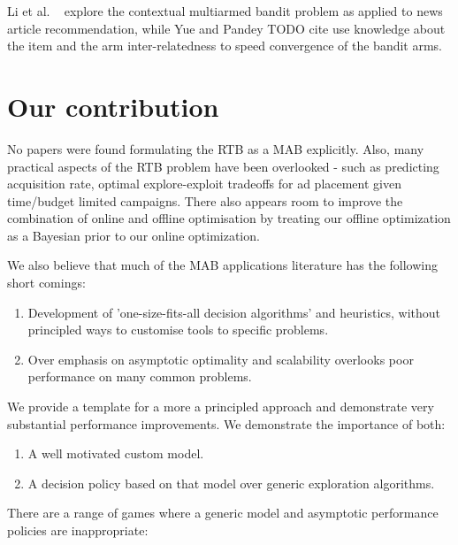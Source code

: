 \documentclass[11pt,a4,singlespacing,titlepagenumber=on]{scrreprt}
\numberwithin{equation}{chapter} %
\theoremstyle{remark}
\begin{document}
Li et al. ~\cite{Li:2010:CAP:1772690.1772758} explore the contextual multiarmed bandit problem as applied to news article recommendation, while Yue and Pandey TODO cite use knowledge about the item and the arm inter-relatedness to speed convergence of the bandit arms.

\section{Our contribution}

No papers were found formulating the RTB as a MAB explicitly. Also, many practical aspects of the RTB problem have been overlooked - such as predicting acquisition rate, optimal explore-exploit tradeoffs for ad placement given time/budget limited campaigns. There also appears room to improve the combination of online and offline optimisation by treating our offline optimization as a Bayesian prior to our online optimization.

We also believe that much of the MAB applications literature has the following short comings:

\begin{enumerate}
	\item Development of 'one-size-fits-all decision algorithms' and heuristics, without principled ways to customise tools to specific problems.
	\item Over emphasis on asymptotic optimality and scalability overlooks poor performance on many common problems.
\end{enumerate}

We provide a template for a more a principled approach and demonstrate very substantial performance improvements. We demonstrate the importance of both:

\begin{enumerate}
	\item A well motivated custom model.
	\item A decision policy based on that model over generic exploration algorithms.
\end{enumerate}

There are a range of games where a generic model and asymptotic performance policies are inappropriate:
\end{document}
